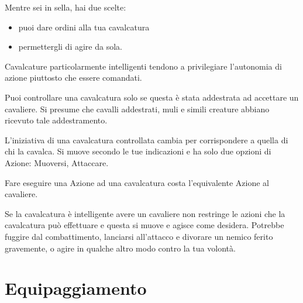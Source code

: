 \documentclass[12pt,a4paper,twoside,openany]{book}
\begin{document}
\begin{multicols}{2}
Mentre sei in sella, hai due scelte:

\begin{itemize}
\item puoi dare ordini alla tua cavalcatura
\item permettergli di agire da sola.
\end{itemize}

Cavalcature particolarmente intelligenti tendono a privilegiare l'autonomia di azione piuttosto che essere comandati.

Puoi controllare una cavalcatura solo se questa è stata addestrata ad accettare un cavaliere. Si presume che cavalli addestrati, muli e simili creature abbiano ricevuto tale addestramento.

L'iniziativa di una cavalcatura controllata cambia per corrispondere a quella di chi la cavalca. Si muove secondo le tue indicazioni e ha solo due opzioni di Azione: Muoversi, Attaccare.

Fare eseguire una Azione ad una cavalcatura costa l'equivalente Azione al cavaliere.

Se la cavalcatura è intelligente avere un cavaliere non restringe le azioni che la cavalcatura può effettuare e questa si muove e agisce come desidera. Potrebbe fuggire dal combattimento, lanciarsi all'attacco e divorare un nemico ferito gravemente, o agire in qualche altro modo contro la tua volontà.

\end{multicols}


\pagebreak

\section{Equipaggiamento}\hypertarget{equipaggiamento}{}\label{equipaggiamento}
\end{document}
